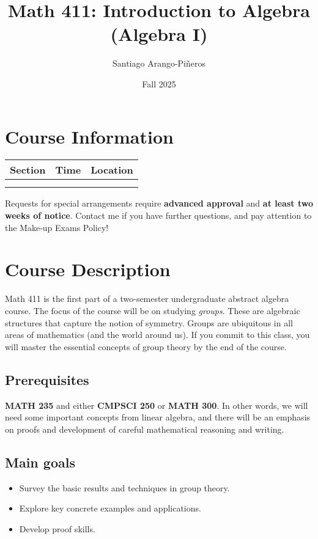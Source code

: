 \documentclass[11pt]{article}
\author{Santiago Arango-Piñeros}
\date{Fall 2025}
\title{Math 411: Introduction to Algebra (Algebra I)}
\begin{document}
\maketitle

\section{Course Information}
\label{sec:org8ad96cd}

\begin{center}
\begin{tabular}{lll}
\hline
Section & Time & Location\\[0pt]
\hline
 &  & \\[0pt]
 &  & \\[0pt]
\hline
\end{tabular}
\end{center}

Requests for special arrangements require \textbf{advanced approval} and \textbf{at least two weeks of notice}.  
Contact me if you have further questions, and pay attention to the Make-up Exams Policy!

\section{Course Description}
\label{sec:orgde5896c}
Math 411 is the first part of a two-semester undergraduate abstract algebra
course. The focus of the course will be on studying \emph{groups}. These are algebraic
structures that capture the notion of symmetry. Groups are ubiquitous in all
areas of mathematics (and the world around us). If you commit to this class,
you will master the essential concepts of group theory by the end of the
course.
\subsection{Prerequisites}
\label{sec:org0c47435}
\textbf{MATH 235} and either \textbf{CMPSCI 250} or \textbf{MATH 300}. In other words, we will need some
important concepts from linear algebra, and there will be an emphasis on proofs
and development of careful mathematical reasoning and writing.

\subsection{Main goals}
\label{sec:orgdb5bf81}
\begin{itemize}
\item Survey the basic results and techniques in group theory.
\item Explore key concrete examples and applications.
\item Develop proof skills.
\end{itemize}
\end{document}
